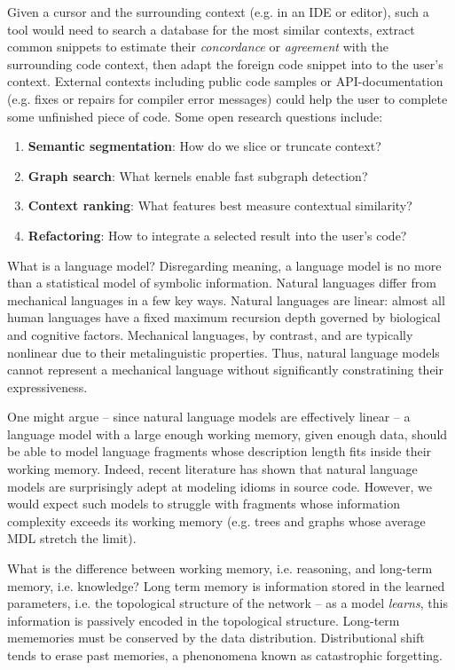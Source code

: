 \documentclass[10pt]{article}
\begin{document}
Given a cursor and the surrounding context (e.g. in an IDE or editor), such a tool would need to search a database for the most similar contexts, extract common snippets to estimate their \textit{concordance} or \textit{agreement} with the surrounding code context, then adapt the foreign code snippet into to the user's context. External contexts including public code samples or API-documentation (e.g. fixes or repairs for compiler error messages) could help the user to complete some unfinished piece of code. Some open research questions include:

  \begin{enumerate}
    \item \textbf{Semantic segmentation}: How do we slice or truncate context?
    \item \textbf{Graph search}: What kernels enable fast subgraph detection?
    \item \textbf{Context ranking}: What features best measure contextual similarity?
    \item \textbf{Refactoring}: How to integrate a selected result into the user's code?
  \end{enumerate}

What is a language model? Disregarding meaning, a language model is no more than a statistical model of symbolic information. Natural languages differ from mechanical languages in a few key ways. Natural languages are linear: almost all human languages have a fixed maximum recursion depth governed by biological and cognitive factors. Mechanical languages, by contrast, and are typically nonlinear due to their metalinguistic properties. Thus, natural language models cannot represent a mechanical language without significantly constratining their expressiveness.

One might argue -- since natural language models are effectively linear -- a language model with a large enough working memory, given enough data, should be able to model language fragments whose description length fits inside their working memory. Indeed, recent literature has shown that natural language models are surprisingly adept at modeling idioms in source code. However, we would expect such models to struggle with fragments whose information complexity exceeds its working memory (e.g. trees and graphs whose average MDL stretch the limit).

What is the difference between working memory, i.e. reasoning, and long-term memory, i.e. knowledge? Long term memory is information stored in the learned parameters, i.e. the topological structure of the network -- as a model \textit{learns}, this information is passively encoded in the topological structure. Long-term mememories must be conserved by the data distribution. Distributional shift tends to erase past memories, a phenonomena known as catastrophic forgetting.
\end{document}
